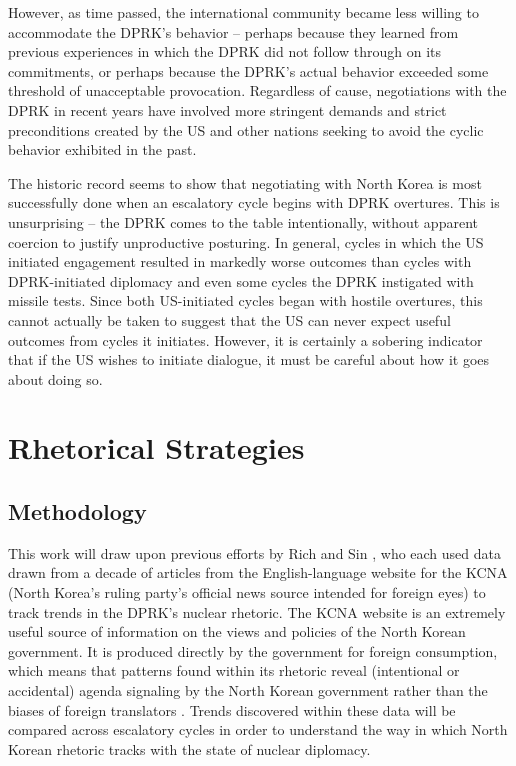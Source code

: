 \documentclass{article}
\begin{document}
However, as time passed, the international community became less willing to accommodate the DPRK’s behavior – perhaps because they learned from previous experiences in which the DPRK did not follow through on its commitments, or perhaps because the DPRK’s actual behavior exceeded some threshold of unacceptable provocation. Regardless of cause, negotiations with the DPRK in recent years have involved more stringent demands and strict preconditions created by the US and other nations seeking to avoid the cyclic behavior exhibited in the past.

The historic record seems to show that negotiating with North Korea is most successfully done when an escalatory cycle begins with DPRK overtures. This is unsurprising – the DPRK comes to the table intentionally, without apparent coercion to justify unproductive posturing. In general, cycles in which the US initiated engagement resulted in markedly worse outcomes than cycles with DPRK-initiated diplomacy and even some cycles the DPRK instigated with missile tests. Since both US-initiated cycles began with hostile overtures, this cannot actually be taken to suggest that the US can never expect useful outcomes from cycles it initiates. However, it is certainly a sobering indicator that if the US wishes to initiate dialogue, it must be careful about how it goes about doing so.

\section{Rhetorical Strategies}

\subsection{Methodology}
This work will draw upon previous efforts by Rich \cite{rich12, rich14} and Sin \cite{sin}, who each used data drawn from a decade of articles from the English-language website for the KCNA (North Korea's ruling party's official news source intended for foreign eyes) to track trends in the DPRK's nuclear rhetoric. The KCNA website is an extremely useful source of information on the views and policies of the North Korean government. It is produced directly by the government for foreign consumption, which means that patterns found within its rhetoric reveal (intentional or accidental) agenda signaling by the North Korean government rather than the biases of foreign translators \cite{rich12}. Trends discovered within these data will be compared across escalatory cycles in order to understand the way in which North Korean rhetoric tracks with the state of nuclear diplomacy.
\end{document}
